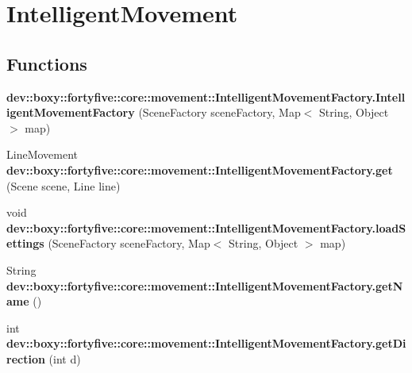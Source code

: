 \hypertarget{group___intelligent_movement}{
\section{IntelligentMovement}
\label{db/d13/group___intelligent_movement}
}
\subsection*{Functions}
\begin{DoxyCompactItemize}
\item 
\hypertarget{group___intelligent_movement_ga139ab6b9d2619f94f2ff08632d21e05e}{
{\bfseries dev::boxy::fortyfive::core::movement::IntelligentMovementFactory.IntelligentMovementFactory} (SceneFactory sceneFactory, Map$<$ String, Object $>$ map)}
\label{db/d13/group___intelligent_movement_ga139ab6b9d2619f94f2ff08632d21e05e}

\item 
\hypertarget{group___intelligent_movement_ga95299f8b15662239d8906eacdb24a660}{
LineMovement {\bfseries dev::boxy::fortyfive::core::movement::IntelligentMovementFactory.get} (Scene scene, Line line)}
\label{db/d13/group___intelligent_movement_ga95299f8b15662239d8906eacdb24a660}

\item 
\hypertarget{group___intelligent_movement_ga289835fb28bb2eb8cd0a2525eab0e25e}{
void {\bfseries dev::boxy::fortyfive::core::movement::IntelligentMovementFactory.loadSettings} (SceneFactory sceneFactory, Map$<$ String, Object $>$ map)}
\label{db/d13/group___intelligent_movement_ga289835fb28bb2eb8cd0a2525eab0e25e}

\item 
\hypertarget{group___intelligent_movement_ga8d7c7e2d9d0afe11ce2690b02bc3edb4}{
String {\bfseries dev::boxy::fortyfive::core::movement::IntelligentMovementFactory.getName} ()}
\label{db/d13/group___intelligent_movement_ga8d7c7e2d9d0afe11ce2690b02bc3edb4}

\item 
\hypertarget{group___intelligent_movement_gac4dd4e21b27029044fcb5bfccb9241cd}{
int {\bfseries dev::boxy::fortyfive::core::movement::IntelligentMovementFactory.getDirection} (int d)}
\label{db/d13/group___intelligent_movement_gac4dd4e21b27029044fcb5bfccb9241cd}

\end{DoxyCompactItemize}
